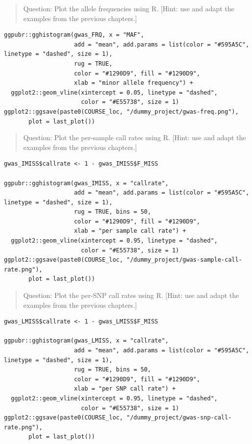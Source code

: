 \documentclass[
]{book}
\begin{document}
\begin{quote}
Question: Plot the allele frequencies using R. {[}Hint: use and adapt the examples from the previous chapters.{]}
\end{quote}

\begin{lstlisting}
ggpubr::gghistogram(gwas_FRQ, x = "MAF",
                    add = "mean", add.params = list(color = "#595A5C", linetype = "dashed", size = 1),
                    rug = TRUE,
                    color = "#1290D9", fill = "#1290D9",
                    xlab = "minor allele frequency") +
  ggplot2::geom_vline(xintercept = 0.05, linetype = "dashed",
                      color = "#E55738", size = 1)
ggplot2::ggsave(paste0(COURSE_loc, "/dummy_project/gwas-freq.png"),
       plot = last_plot())
\end{lstlisting}

\begin{quote}
Question: Plot the per-sample call rates using R. {[}Hint: use and adapt the examples from the previous chapters.{]}
\end{quote}

\begin{lstlisting}
gwas_IMISS$callrate <- 1 - gwas_IMISS$F_MISS

ggpubr::gghistogram(gwas_IMISS, x = "callrate",
                    add = "mean", add.params = list(color = "#595A5C", linetype = "dashed", size = 1),
                    rug = TRUE, bins = 50,
                    color = "#1290D9", fill = "#1290D9",
                    xlab = "per sample call rate") +
  ggplot2::geom_vline(xintercept = 0.95, linetype = "dashed",
                      color = "#E55738", size = 1)
ggplot2::ggsave(paste0(COURSE_loc, "/dummy_project/gwas-sample-call-rate.png"),
       plot = last_plot())
\end{lstlisting}

\begin{quote}
Question: Plot the per-SNP call rates using R. {[}Hint: use and adapt the examples from the previous chapters.{]}
\end{quote}

\begin{lstlisting}
gwas_LMISS$callrate <- 1 - gwas_LMISS$F_MISS

ggpubr::gghistogram(gwas_LMISS, x = "callrate",
                    add = "mean", add.params = list(color = "#595A5C", linetype = "dashed", size = 1),
                    rug = TRUE, bins = 50,
                    color = "#1290D9", fill = "#1290D9",
                    xlab = "per SNP call rate") +
  ggplot2::geom_vline(xintercept = 0.95, linetype = "dashed",
                      color = "#E55738", size = 1)
ggplot2::ggsave(paste0(COURSE_loc, "/dummy_project/gwas-snp-call-rate.png"),
       plot = last_plot())
\end{lstlisting}
\end{document}

